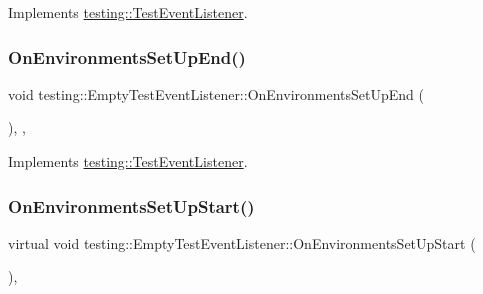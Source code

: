 Implements \mbox{\hyperlink{classtesting_1_1_test_event_listener_aaa1021d75f5dbf3f05c829c1cc520341}{testing\+::\+Test\+Event\+Listener}}.

\mbox{\label{classtesting_1_1_empty_test_event_listener_a9b4e781c0b38065a55c2fd163724ba69}} 
\subsubsection{\texorpdfstring{OnEnvironmentsSetUpEnd()}{OnEnvironmentsSetUpEnd()}\hspace{0.1cm}{\footnotesize\ttfamily [3/3]}}
{\footnotesize\ttfamily void testing\+::\+Empty\+Test\+Event\+Listener\+::\+On\+Environments\+Set\+Up\+End (\begin{DoxyParamCaption}\item[{const \mbox{\hyperlink{classtesting_1_1_unit_test}{Unit\+Test}} \&}]{ }\end{DoxyParamCaption})\hspace{0.3cm}{\ttfamily [inline]}, {\ttfamily [override]}, {\ttfamily [virtual]}}



Implements \mbox{\hyperlink{classtesting_1_1_test_event_listener_aaa1021d75f5dbf3f05c829c1cc520341}{testing\+::\+Test\+Event\+Listener}}.

\mbox{\label{classtesting_1_1_empty_test_event_listener_a156d1965248fbdced6aabacadfa2d63f}} 
\subsubsection{\texorpdfstring{OnEnvironmentsSetUpStart()}{OnEnvironmentsSetUpStart()}\hspace{0.1cm}{\footnotesize\ttfamily [1/3]}}
{\footnotesize\ttfamily virtual void testing\+::\+Empty\+Test\+Event\+Listener\+::\+On\+Environments\+Set\+Up\+Start (\begin{DoxyParamCaption}\item[{const \mbox{\hyperlink{classtesting_1_1_unit_test}{Unit\+Test}} \&}]{ }\end{DoxyParamCaption})\hspace{0.3cm}{\ttfamily [inline]}, {\ttfamily [virtual]}}



